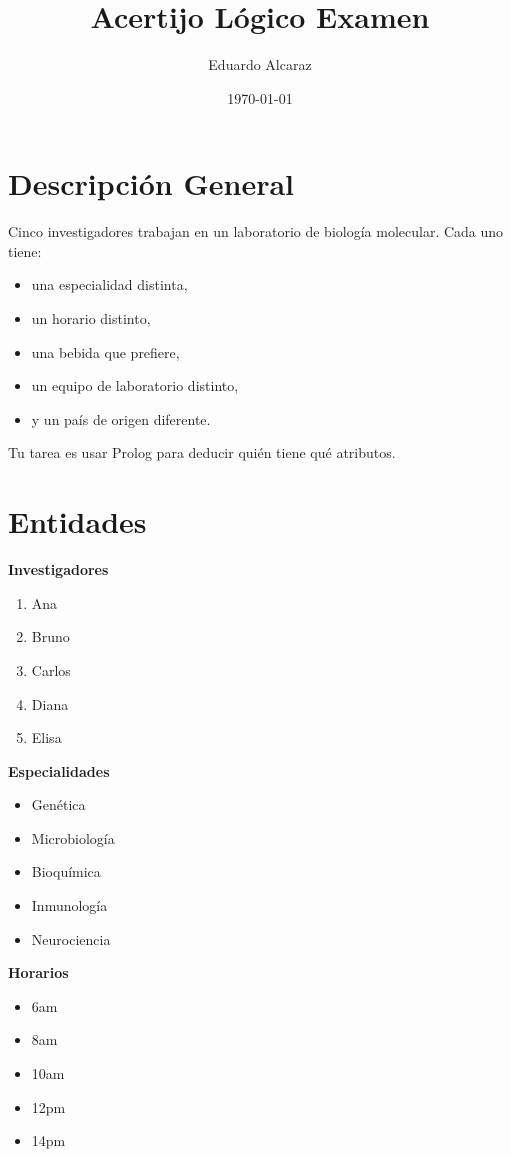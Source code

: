\documentclass[11pt]{article}
\author{Eduardo Alcaraz}
\date{\today}
\title{Acertijo Lógico Examen}
\begin{document}
\maketitle
\tableofcontents

\section*{Descripción General}
\label{sec:org0c95b23}
Cinco investigadores trabajan en un laboratorio de biología molecular.  
Cada uno tiene:
\begin{itemize}
\item una especialidad distinta,
\item un horario distinto,
\item una bebida que prefiere,
\item un equipo de laboratorio distinto,
\item y un país de origen diferente.
\end{itemize}

Tu tarea es usar Prolog para deducir quién tiene qué atributos.

\section*{Entidades}
\label{sec:orga1f7620}

\textbf{\textbf{Investigadores}}
\begin{enumerate}
\item Ana
\item Bruno
\item Carlos
\item Diana
\item Elisa
\end{enumerate}

\textbf{\textbf{Especialidades}}
\begin{itemize}
\item Genética
\item Microbiología
\item Bioquímica
\item Inmunología
\item Neurociencia
\end{itemize}

\textbf{\textbf{Horarios}}
\begin{itemize}
\item 6am
\item 8am
\item 10am
\item 12pm
\item 14pm
\end{itemize}
\end{document}
